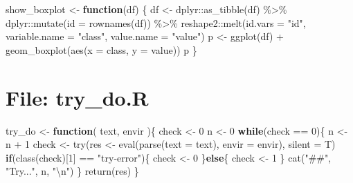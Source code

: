 \documentclass[
]{article}
\newenvironment{Shaded}{\begin{snugshade}}{\end{snugshade}}
\newcommand{\AttributeTok}[1]{\textcolor[rgb]{0.77,0.63,0.00}{#1}}
\newcommand{\ControlFlowTok}[1]{\textcolor[rgb]{0.13,0.29,0.53}{\textbf{#1}}}
\newcommand{\DecValTok}[1]{\textcolor[rgb]{0.00,0.00,0.81}{#1}}
\newcommand{\FunctionTok}[1]{\textcolor[rgb]{0.00,0.00,0.00}{#1}}
\newcommand{\NormalTok}[1]{#1}
\newcommand{\OtherTok}[1]{\textcolor[rgb]{0.56,0.35,0.01}{#1}}
\newcommand{\SpecialCharTok}[1]{\textcolor[rgb]{0.00,0.00,0.00}{#1}}
\newcommand{\StringTok}[1]{\textcolor[rgb]{0.31,0.60,0.02}{#1}}
\begin{document}
\begin{Shaded}
\begin{Highlighting}[]
\NormalTok{show\_boxplot }\OtherTok{\textless{}{-}} 
  \ControlFlowTok{function}\NormalTok{(df)}
\NormalTok{  \{}
\NormalTok{    df }\OtherTok{\textless{}{-}}\NormalTok{ dplyr}\SpecialCharTok{::}\FunctionTok{as\_tibble}\NormalTok{(df) }\SpecialCharTok{\%\textgreater{}\%} 
\NormalTok{      dplyr}\SpecialCharTok{::}\FunctionTok{mutate}\NormalTok{(}\AttributeTok{id =} \FunctionTok{rownames}\NormalTok{(df)) }\SpecialCharTok{\%\textgreater{}\%} 
\NormalTok{      reshape2}\SpecialCharTok{::}\FunctionTok{melt}\NormalTok{(}\AttributeTok{id.vars =} \StringTok{"id"}\NormalTok{, }\AttributeTok{variable.name =} \StringTok{"class"}\NormalTok{, }\AttributeTok{value.name =} \StringTok{"value"}\NormalTok{)}
\NormalTok{    p }\OtherTok{\textless{}{-}} \FunctionTok{ggplot}\NormalTok{(df) }\SpecialCharTok{+}
      \FunctionTok{geom\_boxplot}\NormalTok{(}\FunctionTok{aes}\NormalTok{(}\AttributeTok{x =}\NormalTok{ class, }\AttributeTok{y =}\NormalTok{ value))}
\NormalTok{    p }
\NormalTok{  \}}
\end{Highlighting}
\end{Shaded}

\hypertarget{file-try_do.r}{%
\section{File: try\_do.R}\label{file-try_do.r}}

\begin{Shaded}
\begin{Highlighting}[]
\NormalTok{try\_do }\OtherTok{\textless{}{-}} 
  \ControlFlowTok{function}\NormalTok{(}
\NormalTok{           text,}
\NormalTok{           envir}
\NormalTok{           )\{}
\NormalTok{    check }\OtherTok{\textless{}{-}} \DecValTok{0}
\NormalTok{    n }\OtherTok{\textless{}{-}} \DecValTok{0}
    \ControlFlowTok{while}\NormalTok{(check }\SpecialCharTok{==} \DecValTok{0}\NormalTok{)\{}
\NormalTok{      n }\OtherTok{\textless{}{-}}\NormalTok{ n }\SpecialCharTok{+} \DecValTok{1}
\NormalTok{      check }\OtherTok{\textless{}{-}} \FunctionTok{try}\NormalTok{(res }\OtherTok{\textless{}{-}} \FunctionTok{eval}\NormalTok{(}\FunctionTok{parse}\NormalTok{(}\AttributeTok{text =}\NormalTok{ text), }\AttributeTok{envir =}\NormalTok{ envir), }\AttributeTok{silent =}\NormalTok{ T)}
      \ControlFlowTok{if}\NormalTok{(}\FunctionTok{class}\NormalTok{(check)[}\DecValTok{1}\NormalTok{] }\SpecialCharTok{==} \StringTok{"try{-}error"}\NormalTok{)\{}
\NormalTok{        check }\OtherTok{\textless{}{-}} \DecValTok{0}
\NormalTok{      \}}\ControlFlowTok{else}\NormalTok{\{}
\NormalTok{        check }\OtherTok{\textless{}{-}} \DecValTok{1}
\NormalTok{      \}}
      \FunctionTok{cat}\NormalTok{(}\StringTok{"\#\#"}\NormalTok{, }\StringTok{"Try..."}\NormalTok{, n, }\StringTok{"}\SpecialCharTok{\textbackslash{}n}\StringTok{"}\NormalTok{)}
\NormalTok{    \}}
    \FunctionTok{return}\NormalTok{(res)}
\NormalTok{  \}}
\end{Highlighting}
\end{Shaded}
\end{document}

